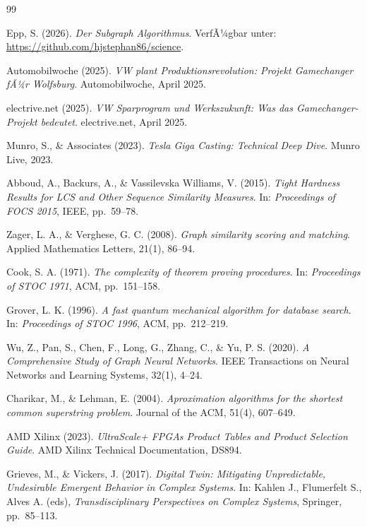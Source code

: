 ﻿\documentclass[a4paper,12pt]{article}
\theoremstyle{definition}
\begin{document}
\begin{thebibliography}{99}

Epp, S. (2026).
\textit{Der Subgraph Algorithmus}.
VerfÃ¼gbar unter: \url{https://github.com/hjstephan86/science}.

Automobilwoche (2025).
\textit{VW plant Produktionsrevolution: Projekt Gamechanger fÃ¼r Wolfsburg}.
Automobilwoche, April 2025.

electrive.net (2025).
\textit{VW Sparprogram und Werkszukunft: Was das Gamechanger-Projekt bedeutet}.
electrive.net, April 2025.

Munro, S., \& Associates (2023).
\textit{Tesla Giga Casting: Technical Deep Dive}.
Munro Live, 2023.

Abboud, A., Backurs, A., \& Vassilevska Williams, V. (2015).
\textit{Tight Hardness Results for LCS and Other Sequence Similarity Measures}.
In: \textit{Proceedings of FOCS 2015}, IEEE, pp.~59--78.

Zager, L. A., \& Verghese, G. C. (2008).
\textit{Graph similarity scoring and matching}.
Applied Mathematics Letters, 21(1), 86--94.

Cook, S. A. (1971).
\textit{The complexity of theorem proving procedures}.
In: \textit{Proceedings of STOC 1971}, ACM, pp.~151--158.

Grover, L. K. (1996).
\textit{A fast quantum mechanical algorithm for database search}.
In: \textit{Proceedings of STOC 1996}, ACM, pp.~212--219.

Wu, Z., Pan, S., Chen, F., Long, G., Zhang, C., \& Yu, P. S. (2020).
\textit{A Comprehensive Study of Graph Neural Networks}.
IEEE Transactions on Neural Networks and Learning Systems, 32(1), 4--24.

Charikar, M., \& Lehman, E. (2004).
\textit{Aproximation algorithms for the shortest common superstring problem}.
Journal of the ACM, 51(4), 607--649.

AMD Xilinx (2023).
\textit{UltraScale+ FPGAs Product Tables and Product Selection Guide}.
AMD Xilinx Technical Documentation, DS894.

Grieves, M., \& Vickers, J. (2017).
\textit{Digital Twin: Mitigating Unpredictable, Undesirable Emergent Behavior in Complex Systems}.
In: Kahlen J., Flumerfelt S., Alves A. (eds), \textit{Transdisciplinary Perspectives on Complex Systems},
Springer, pp.~85--113.


\end{thebibliography}
\end{document}

